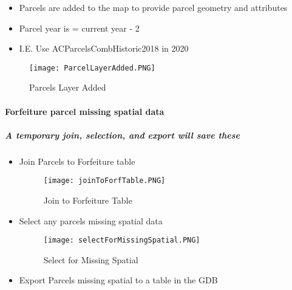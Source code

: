   \begin{itemize}
  \item {Parcels are added to the map to provide parcel geometry and attributes}
  \item {Parcel year is = current year - 2}
  \item {I.E. Use ACParcelsCombHistoric2018 in 2020}
  \end{itemize}

  \vspace{.25in}

  \begin{figure}[h!]
  \centering
      \texttt{[image: ParcelLayerAdded.PNG]}
  \caption{Parcels Layer Added}
  \end{figure}
  \clearpage







   \paragraph{Forfeiture parcel missing spatial data}

   \subparagraph*{A temporary join, selection, and export will save these}

   \vspace{.3in}

  \begin{itemize}
  \item {Join Parcels to Forfeiture table}



  \begin{figure}[h!]
  \centering
      \texttt{[image: joinToForfTable.PNG]}
  \caption{Join to Forfeiture Table}
  \end{figure}
  \clearpage



  \item {Select any parcels missing spatial data}



  \begin{figure}[h!]
  \centering
      \texttt{[image: selectForMissingSpatial.PNG]}
  \caption{Select for Missing Spatial}
  \end{figure}

  \item {Export Parcels missing spatial to a table in the GDB}

  \end{itemize}


